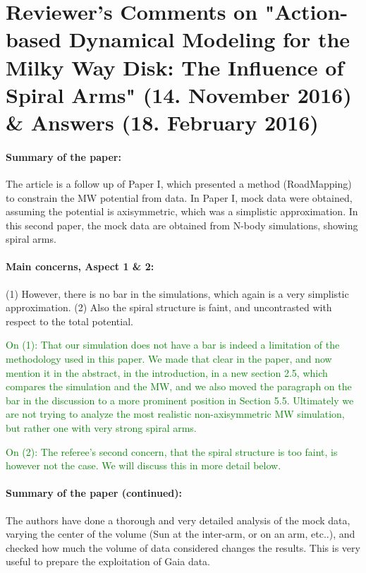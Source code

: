 \documentclass[10pt,a4paper]{article}
\newcommand{\Answer}[1]{\textcolor{Green}{#1}}
\begin{document}
\section*{Reviewer's Comments on "Action-based Dynamical Modeling for the Milky Way Disk: The Influence of Spiral Arms" (14. November 2016) \& Answers (18. February 2016)}

\paragraph{Summary of the paper:} The article is a follow up of Paper I, which presented a method (RoadMapping) to constrain the MW potential from data. In Paper I, mock data were obtained, assuming
the potential is axisymmetric, which was a simplistic approximation. In this second
paper, the mock data are obtained from N-body simulations, showing spiral arms.

\paragraph{Main concerns, Aspect 1 \& 2:} (1) However, there is no bar in the simulations, which again is a very simplistic approximation.  (2) Also the spiral structure is faint, and uncontrasted with respect to
the total potential.

\Answer{On (1): That our simulation does not have a bar is indeed a limitation of the methodology used in this paper. We made that clear in the paper, and now mention it in the abstract, in the introduction, in a new section 2.5, which compares the simulation and the MW, and we also moved the paragraph on the bar in the discussion to a more prominent position in Section 5.5. Ultimately we are not trying to analyze the most realistic non-axisymmetric MW simulation, but rather one with very strong spiral arms.}

\Answer{On (2): The referee's second concern, that the spiral structure is too faint, is however not the case. We will discuss this in more detail below.}
 
\paragraph{Summary of the paper (continued):} The authors have done a thorough and very detailed analysis of the mock data, varying the center of the volume (Sun at the inter-arm, or on an arm, etc..), and
checked how much the volume of data considered changes the results. This is very
useful to prepare the exploitation of Gaia data.
\end{document}
